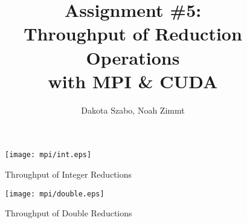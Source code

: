 \documentclass[12pt]{article}
\begin{document}
\author{Dakota Szabo, Noah Zimmt}
\title{ Assignment \#5: \\
	\textbf{
		Throughput of Reduction Operations \\
		with MPI \& CUDA
	}
}
\maketitle



\begin{figure}
	\texttt{[image: mpi/int.eps]}
	\caption{Throughput of Integer Reductions}
\end{figure}

\begin{figure}
	\texttt{[image: mpi/double.eps]}
	\caption{Throughput of Double Reductions}
\end{figure}
\end{document}
